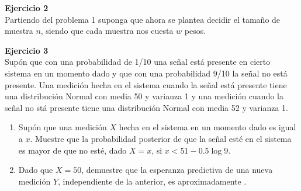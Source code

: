 \documentclass[a4paper, 11pt]{article}
\newenvironment{problem}[2][Ejercicio]
{ \begin{mdframed}[backgroundcolor= red!50] \textbf{#1 #2} \\}
	{  \end{mdframed}}
\begin{document}
\begin{problem}{2}
    Partiendo del problema 1 suponga que ahora se plantea decidir el tamaño de muestra $n$, siendo que cada muestra nos cuesta $w $ pesos.
\end{problem}

\begin{problem}{3}       
    Supón que con una probabilidad de 1/10  una señal está presente en cierto sistema en un momento dado y que con una probabilidad 9/10 la señal no está presente. Una medición hecha en el sistema cuando la señal está presente tiene una distribución Normal con media 50 y varianza 1 y una medición cuando la señal no stá presente tiene una distribución Normal con media 52 y varianza 1.
    \begin{enumerate}
        \item Supón que una medición $X$ hecha en el sistema en un momento dado es igual a $x$. Muestre que la probabilidad posterior de que la señal esté en el sistema es mayor de que no esté, dado $X = x$, si $x < 51 - \text{0.5} \log 9$.
        \item Dado que $X = 50$, demuestre que la esperanza predictiva de una nueva medición $Y$, independiente de la anterior, es aproximadamente  .
    \end{enumerate}
\end{problem}
\end{document}
